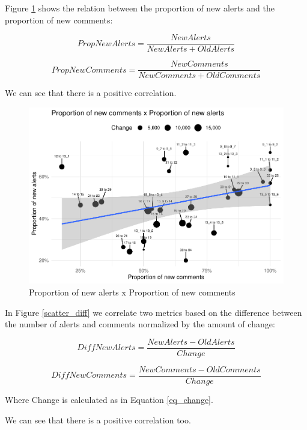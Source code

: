 \documentclass[
]{article}
\begin{document}
Figure \ref{scatter_prop} shows the relation between the proportion of
new alerts and the proportion of new comments:

\[PropNewAlerts = \frac{NewAlerts}{NewAlerts + OldAlerts}\]

\[PropNewComments = \frac{NewComments}{NewComments + OldComments}\]

We can see that there is a positive correlation.

\small

\begin{figure}
\centering
\includegraphics{report_files/figure-latex/unnamed-chunk-21-1.pdf}
\caption{\label{scatter_prop}Proportion of new alerts x Proportion of
new comments}
\end{figure}

\normalsize

In Figure \ref{scatter_diff} we correlate two metrics based on the
difference between the number of alerts and comments normalized by the
amount of change:

\[DiffNewAlerts = \frac{NewAlerts - OldAlerts}{Change}\]

\[DiffNewComments = \frac{NewComments - OldComments}{Change}\]

Where Change is calculated as in Equation \ref{eq_change}.

We can see that there is a positive correlation too.

\small
\end{document}
